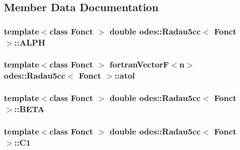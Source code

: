 \subsection{Member Data Documentation}
\hypertarget{classodes_1_1Radau5cc_a42e13c53f1b12eee97f358a2913f8e4f}{
\subsubsection[{A\-L\-P\-H}]{\setlength{\rightskip}{0pt plus 5cm}template$<$class Fonct $>$ double {\bf odes\-::\-Radau5cc}$<$ Fonct $>$\-::A\-L\-P\-H\hspace{0.3cm}{\ttfamily [private]}}}\label{classodes_1_1Radau5cc_a42e13c53f1b12eee97f358a2913f8e4f}
\hypertarget{classodes_1_1Radau5cc_a4a905596498d2d8ab9f46201d54eaa4d}{
\subsubsection[{atol}]{\setlength{\rightskip}{0pt plus 5cm}template$<$class Fonct $>$ {\bf fortran\-Vector\-F}$<${\bf n}$>$ {\bf odes\-::\-Radau5cc}$<$ Fonct $>$\-::atol\hspace{0.3cm}{\ttfamily [private]}}}\label{classodes_1_1Radau5cc_a4a905596498d2d8ab9f46201d54eaa4d}
\hypertarget{classodes_1_1Radau5cc_aca32380625f370758068d4c225958cd1}{
\subsubsection[{B\-E\-T\-A}]{\setlength{\rightskip}{0pt plus 5cm}template$<$class Fonct $>$ double {\bf odes\-::\-Radau5cc}$<$ Fonct $>$\-::B\-E\-T\-A\hspace{0.3cm}{\ttfamily [private]}}}\label{classodes_1_1Radau5cc_aca32380625f370758068d4c225958cd1}
\hypertarget{classodes_1_1Radau5cc_ad1df67bebb6c9753e789643dbbac4b64}{
\subsubsection[{C1}]{\setlength{\rightskip}{0pt plus 5cm}template$<$class Fonct $>$ double {\bf odes\-::\-Radau5cc}$<$ Fonct $>$\-::C1\hspace{0.3cm}{\ttfamily [private]}}}\label{classodes_1_1Radau5cc_ad1df67bebb6c9753e789643dbbac4b64}
